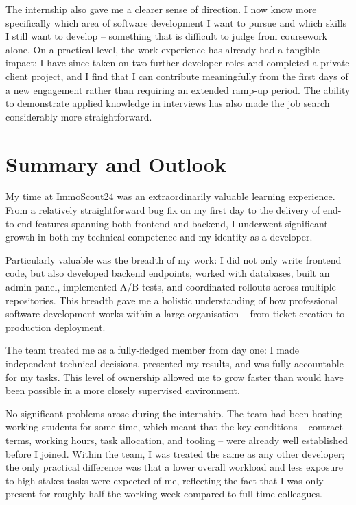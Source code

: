 \documentclass[a4paper, 12pt]{article}
\let\oldsection\section
\renewcommand{\section}{\clearpage\oldsection}
\begin{document}
The internship also gave me a clearer sense of direction. I now know more specifically
which area of software development I want to pursue and which skills I still want to
develop -- something that is difficult to judge from coursework alone. On a practical
level, the work experience has already had a tangible impact: I have since taken on
two further developer roles and completed a private client project, and I find that I
can contribute meaningfully from the first days of a new engagement rather than
requiring an extended ramp-up period. The ability to demonstrate applied knowledge in
interviews has also made the job search considerably more straightforward.


\section{Summary and Outlook}

My time at ImmoScout24 was an extraordinarily valuable learning experience. From a
relatively straightforward bug fix on my first day to the delivery of end-to-end
features spanning both frontend and backend, I underwent significant growth in both my
technical competence and my identity as a developer.

Particularly valuable was the breadth of my work: I did not only write frontend code,
but also developed backend endpoints, worked with databases, built an admin panel,
implemented A/B tests, and coordinated rollouts across multiple repositories. This
breadth gave me a holistic understanding of how professional software development works
within a large organisation -- from ticket creation to production deployment.

The team treated me as a fully-fledged member from day one: I made independent
technical decisions, presented my results, and was fully accountable for my tasks.
This level of ownership allowed me to grow faster than would have been possible in a
more closely supervised environment.

No significant problems arose during the internship. The team had been hosting working
students for some time, which meant that the key conditions -- contract terms, working
hours, task allocation, and tooling -- were already well established before I joined.
Within the team, I was treated the same as any other developer; the only practical
difference was that a lower overall workload and less exposure to high-stakes tasks
were expected of me, reflecting the fact that I was only present for roughly half the
working week compared to full-time colleagues.
\end{document}
